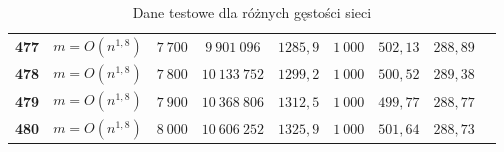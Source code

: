 \begin{table}[h]
\begin{tabular}{lcccccccc}
\textbf{477} & $ m = O \left( n^{1,8} \right) $ & $7~700$ & $9~901~096$ & $1285,9$ & $1~000$ & $502,13$ & $288,89$ &  \\
\textbf{478} & $ m = O \left( n^{1,8} \right) $ & $7~800$ & $10~133~752$ & $1299,2$ & $1~000$ & $500,52$ & $289,38$ &  \\
\textbf{479} & $ m = O \left( n^{1,8} \right) $ & $7~900$ & $10~368~806$ & $1312,5$ & $1~000$ & $499,77$ & $288,77$ &  \\
\textbf{480} & $ m = O \left( n^{1,8} \right) $ & $8~000$ & $10~606~252$ & $1325,9$ & $1~000$ & $501,64$ & $288,73$ &  \\
\hline
\end{tabular}
\caption{Dane testowe dla różnych gęstości sieci}
\label{tab:denceTest}
\end{table}

